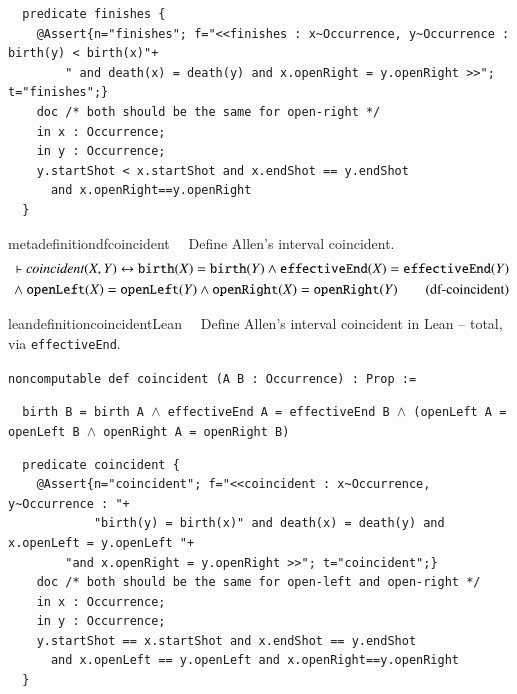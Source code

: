 \begin{lstlisting}
  predicate finishes {
    @Assert{n="finishes"; f="<<finishes : x~Occurrence, y~Occurrence : birth(y) < birth(x)"+
        " and death(x) = death(y) and x.openRight = y.openRight >>"; t="finishes";}
    doc /* both should be the same for open-right */
    in x : Occurrence;
    in y : Occurrence;
    y.startShot < x.startShot and x.endShot == y.endShot
      and x.openRight==y.openRight
  }
\end{lstlisting}

\begin{restatable}{metadefinition}{dfcoincident}~~ Define Allen's interval coincident.
\begin{align}
\vdash \textit{coincident}(X,Y) \leftrightarrow \texttt{birth}(X) = \texttt{birth}(Y) \wedge \texttt{effectiveEnd}(X) = \texttt{effectiveEnd}(Y) \notag \\
~\wedge~ \texttt{openLeft}(X) = \texttt{openLeft}(Y) \wedge \texttt{openRight}(X) = \texttt{openRight}(Y)
\label{eq:df-coincident}\tag{df-coincident}
\end{align}
\end{restatable}

\begin{restatable}{leandefinition}{coincidentLean}~~ Define Allen's interval coincident in
Lean -- total, via \texttt{effectiveEnd}.

\texttt{\textcolor{leancolor}{noncomputable def} \textcolor{leanyellow}{coincident} (A B : Occurrence) : Prop :=}

\texttt{~~birth B = birth A $\wedge$ effectiveEnd A = effectiveEnd B $\wedge$ (openLeft A = openLeft B $\wedge$ openRight A = openRight B)}
\label{coincident}
\end{restatable}

\begin{lstlisting}
  predicate coincident {
    @Assert{n="coincident"; f="<<coincident : x~Occurrence, y~Occurrence : "+
    		"birth(y) = birth(x)" and death(x) = death(y) and x.openLeft = y.openLeft "+
		"and x.openRight = y.openRight >>"; t="coincident";}
    doc /* both should be the same for open-left and open-right */
    in x : Occurrence;
    in y : Occurrence;
    y.startShot == x.startShot and x.endShot == y.endShot
      and x.openLeft == y.openLeft and x.openRight==y.openRight
  }
\end{lstlisting}

